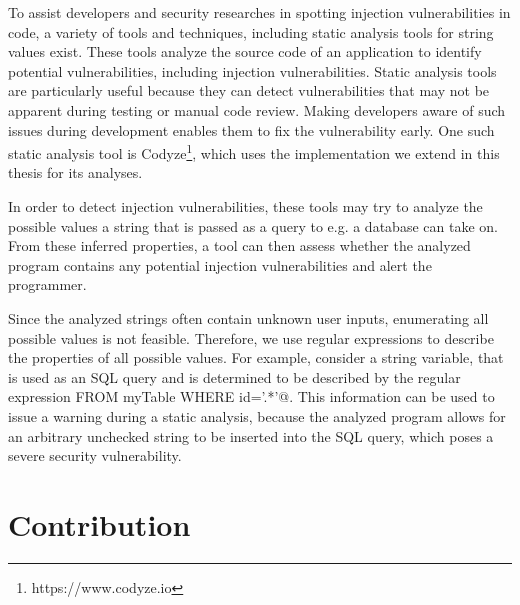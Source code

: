 To assist developers and security researches in spotting injection vulnerabilities in code, a variety of tools and techniques, including static analysis tools for string values exist. These tools analyze the source code of an application to identify potential vulnerabilities, including injection vulnerabilities. Static analysis tools are particularly useful because they can detect vulnerabilities that may not be apparent during testing or manual code review. Making developers aware of such issues during development enables them to fix the vulnerability early. One such static analysis tool is Codyze\footnote{https://www.codyze.io}, which uses the implementation we extend in this thesis for its analyses.

In order to detect injection vulnerabilities, these tools may try to analyze the possible values a string that is passed as a query to e.g. a database can take on.
From these inferred properties, a tool can then assess whether the analyzed program contains any potential injection vulnerabilities and alert the programmer.

Since the analyzed strings often contain unknown user inputs, enumerating all possible values is not feasible. 
Therefore, we use regular expressions to describe the properties of all possible values.
For example, consider a string variable, that is used as an SQL query and is determined to be described by the regular expression \Verb@DELETE \* FROM myTable WHERE id='.*'@.
This information can be used to issue a warning during a static analysis, because the analyzed program allows for an arbitrary unchecked string to be inserted into the SQL query, which poses a severe security vulnerability.

\section{Contribution}\label{sec:intro:contribution}

